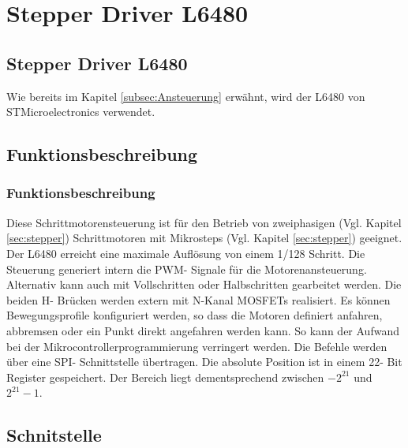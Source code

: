 \ifSTANDALONE
    \section{Stepper Driver L6480} \label{sec:L6480}
\fi
\ifEMBED
    \subsection{Stepper Driver L6480} \label{sec:L6480}
\fi
\ifEMBED
    \BLDCcollab
\fi
Wie bereits im Kapitel \ref*{subsec:Ansteuerung} erwähnt, wird der L6480 von STMicroelectronics verwendet. 

\ifSTANDALONE
    \subsection{Funktionsbeschreibung}
\fi
\ifEMBED
    \subsubsection{Funktionsbeschreibung}
\fi
    Diese Schrittmotorensteuerung ist für den Betrieb von zweiphasigen (Vgl. 
    Kapitel \ref{sec:stepper}) Schrittmotoren mit Mikrosteps (Vgl. Kapitel 
    \ref{sec:stepper}) geeignet. Der L6480 erreicht eine maximale Auflösung 
    von einem 1/128 Schritt. Die Steuerung generiert intern die PWM- Signale 
    für die Motorenansteuerung. Alternativ kann auch mit Vollschritten oder 
    Halbschritten gearbeitet werden. Die beiden H- Brücken werden extern mit 
    N-Kanal MOSFETs realisiert. Es können Bewegungsprofile konfiguriert 
    werden, so dass die Motoren definiert anfahren, abbremsen oder ein Punkt 
    direkt angefahren werden kann. So kann der Aufwand bei der 
    Mikrocontrollerprogrammierung verringert werden. Die Befehle werden über 
    eine SPI- Schnittstelle übertragen. Die absolute Position ist in einem 22- 
    Bit Register gespeichert. Der Bereich liegt dementsprechend zwischen 
    \(-2^{21}\) und \(2^{21}-1\). \cite{Datasheet:L6480} 

\ifSTANDALONE
    \subsection{Schnitstelle}
\fi
\ifEMBED
